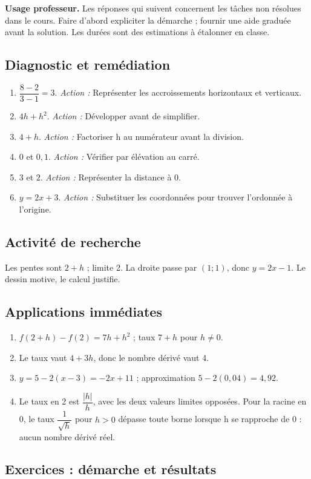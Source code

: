 \label{C04-CORR}
\textbf{Usage professeur.} Les réponses qui suivent concernent les tâches non résolues dans le cours. Faire d’abord expliciter la démarche ; fournir une aide graduée avant la solution. Les durées sont des estimations à étalonner en classe.
\subsection*{Diagnostic et remédiation}
\begin{enumerate}
\item $\dfrac{8-2}{3-1}=3$. \textit{Action :} Représenter les accroissements horizontaux et verticaux.
\item $4h+h^2$. \textit{Action :} Développer avant de simplifier.
\item $4+h$. \textit{Action :} Factoriser h au numérateur avant la division.
\item $0$ et $0{,}1$. \textit{Action :} Vérifier par élévation au carré.
\item $3$ et $2$. \textit{Action :} Représenter la distance à 0.
\item $y=2x+3$. \textit{Action :} Substituer les coordonnées pour trouver l’ordonnée à l’origine.
\end{enumerate}
\subsection*{Activité de recherche}
Les pentes sont $2+h$ ; limite 2. La droite passe par $(1;1)$, donc $y=2x-1$. Le dessin motive, le calcul justifie.
\subsection*{Applications immédiates}
\begin{enumerate}
\item $f(2+h)-f(2)=7h+h^2$ ; taux $7+h$ pour $h\ne0$.
\item Le taux vaut $4+3h$, donc le nombre dérivé vaut 4.
\item $y=5-2(x-3)=-2x+11$ ; approximation $5-2(0{,}04)=4{,}92$.
\item Le taux en 2 est $\dfrac{|h|}{h}$, avec les deux valeurs limites opposées. Pour la racine en 0, le taux $\dfrac{1}{\sqrt h}$ pour $h>0$ dépasse toute borne lorsque h se rapproche de 0 : aucun nombre dérivé réel.
\end{enumerate}
\subsection*{Exercices : démarche et résultats}
